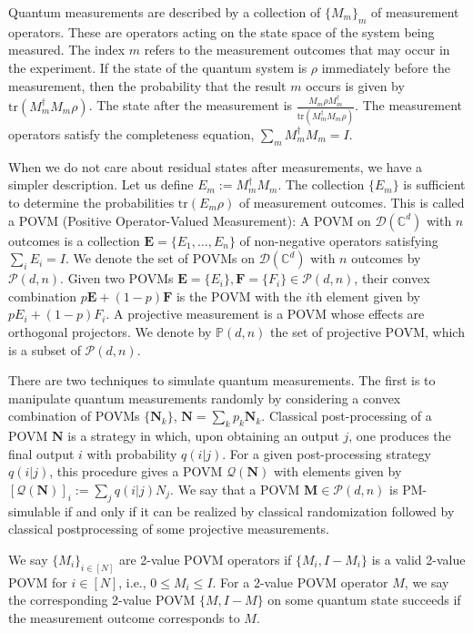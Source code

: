 Quantum measurements are described by a collection of $\{M_m\}_m$ of measurement operators. These are operators acting on the state space of the system being measured. The index $m$ refers to the measurement outcomes that may occur in the experiment. If the state of the quantum system is $\rho$ immediately before the measurement, then the probability that the result $m$ occurs is given by $\mathrm{tr}(M_m^\dagger M_m \rho)$. The state after the measurement is $\frac{M_m \rho M_m^\dagger}{\mathrm{tr}(M_m^\dagger M_m \rho)}$. The measurement operators satisfy the completeness equation, $\sum_m M_m^\dagger M_m = I$.

When we do not care about residual states after measurements, we have a simpler description. Let us define $E_m:=M_m^\dagger M_m$. The collection $\{E_m\}$ is sufficient to determine the probabilities $\mathrm{tr}(E_m\rho)$ of measurement outcomes. This is called a POVM (Positive Operator-Valued Measurement): A POVM on $\mathcal{D}(\mathbb{C}^d)$ with $n$ outcomes is a collection $\mathbf{E}=\{E_1,\ldots,E_n\}$ of non-negative operators satisfying $\sum_i E_i = I$. We denote the set of POVMs on $\mathcal{D}(\mathbb{C}^d)$ with $n$ outcomes by $\mathcal{P}(d,n)$. Given two POVMs $\mathbf{E}=\{E_i\},\mathbf{F}=\{F_i\} \in \mathcal{P}(d,n)$, their convex combination $p \mathbf{E} + (1-p) \mathbf{F}$ is the POVM with the $i$th element given by $p E_i + (1-p) F_i$. A projective measurement is a POVM whose effects are orthogonal projectors. We denote by $\mathbb{P}(d,n)$ the set of projective POVM, which is a subset of $\mathcal{P}(d,n)$.

There are two techniques to simulate quantum measurements. The first is to manipulate quantum measurements randomly by considering a convex combination of POVMs $\{ \mathbf{N}_k \}$, $\mathbf{N}=\sum_k p_k \mathbf{N}_k$. Classical post-processing of a POVM $\mathbf{N}$ is a strategy in which, upon obtaining an output $j$, one produces the final output $i$ with probability $q(i|j)$. For a given post-processing strategy $q(i|j)$, this procedure gives a POVM $\mathcal{Q}(\mathbf{N})$ with elements given by $[\mathcal{Q}(\mathbf{N})]_i := \sum_j q(i|j)N_j$. We say that a POVM $\mathbf{M} \in \mathcal{P}(d,n)$ is PM-simulable if and only if it can be realized by classical randomization followed by classical postprocessing of some projective measurements.

We say $\{M_i\}_{i \in [N] }$ are 2-value POVM operators if $\{M_i,I-M_i\}$ is a valid 2-value POVM for $i \in [N]$, i.e., $0 \leq M_i \leq I$. For a 2-value POVM operator $M$, we say the corresponding 2-value POVM $\{M,I-M\}$ on some quantum state succeeds if the measurement outcome corresponds to $M$. 

